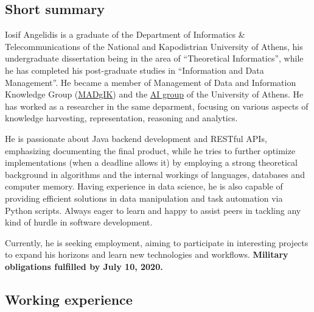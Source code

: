 \documentclass[a4paper,oneside,11pt]{article}
\begin{document}
\newpage

\subsection*{Short summary}

\begin{sloppypar}
	Iosif Angelidis is a graduate of the Department
	of Informatics \& Telecommunications of the National and Kapodistrian University of Athens, his undergraduate 
	dissertation being in the area of ``Theoretical Informatics'', while he has completed his post-graduate studies in ``Information and Data
	Management''. He became a member of Management of Data and Information Knowledge Group
	(\href{http://www.madgik.di.uoa.gr}{MADgIK}) and the \href{http://ai.di.uoa.gr/}{AI group} of the University of Athens. He has worked as a researcher in the same deparment, focusing on various aspects of knowledge harvesting, representation, reasoning and analytics.
\end{sloppypar}

\begin{sloppypar}
	He is passionate about Java backend development and RESTful APIs, emphasizing documenting the final product, while he tries to further optimize implementations (when a deadline allows it) by employing a strong theoretical background in algorithms and the internal workings of languages, databases and computer memory. Having experience in data science, he is also capable of providing efficient solutions in data manipulation and task automation via Python scripts. Always eager to learn and happy to assist peers in tackling any kind of hurdle in software development. 
\end{sloppypar}

\begin{sloppypar}
	Currently, he is seeking employment, aiming to participate in interesting projects to expand his horizons and learn new technologies and workflows. \textbf{Military obligations fulfilled by July 10, 2020.}
\end{sloppypar}

\subsection*{Working experience}
\end{document}
